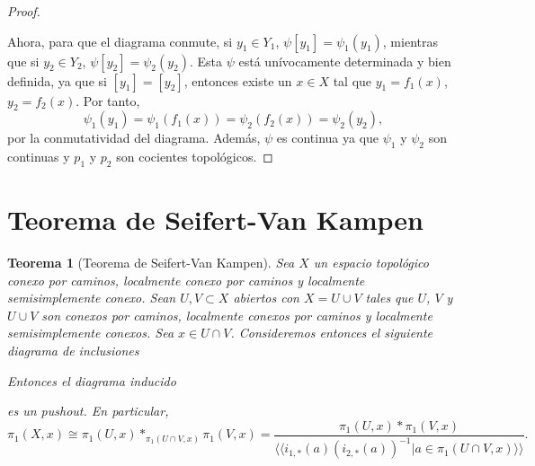 \documentclass[12pt,a4paper]{book}
\newtheorem{thm}{Teorema}[section]
\theoremstyle{definition} \newtheorem{defn}[thm]{Definición}
\theoremstyle{definition} \newtheorem{ejemplo}[thm]{Ejemplo}
\theoremstyle{definition} \newtheorem{ejercicio}[thm]{Ejercicio}
\theoremstyle{remark} \newtheorem*{obs}{Observación}
\def\gf{\pi_1}
\begin{document}
\begin{proof}
\begin{center}
\begin{tikzcd}
    \end{tikzcd}
  \end{center}
  Ahora, para que el diagrama conmute, si $y_1 \in Y_1$, $\psi[y_1]=\psi_1(y_1)$, mientras que si $y_2 \in Y_2$, $\psi[y_2]=\psi_2(y_2)$. Esta $\psi$ está unívocamente determinada y bien definida, ya que si $[y_1]=[y_2]$, entonces existe un $x\in X$ tal que $y_1=f_1(x)$, $y_2=f_2(x)$. Por tanto,
  \begin{equation*}
    \psi_1(y_1)=\psi_1(f_1(x))=\psi_2(f_2(x))=\psi_2(y_2),	
  \end{equation*}
  por la conmutatividad del diagrama.
  Además, $\psi$ es continua ya que $\psi_1$ y $\psi_2$ son continuas y $p_1$ y $p_2$ son cocientes topológicos.
\end{proof}

\section{Teorema de Seifert-Van Kampen}
\begin{thm}[Teorema de Seifert-Van Kampen]
 Sea $X$ un espacio topológico conexo por caminos, localmente conexo por caminos y localmente semisimplemente conexo. Sean $U,V\subset X$ abiertos con $X=U\cup V$ tales que $U$, $V$ y $U\cup V$ son conexos por caminos, localmente conexos por caminos y localmente semisimplemente conexos. Sea $x\in U\cap V$. Consideremos entonces el siguiente diagrama de inclusiones
 \begin{center}
 \end{center}
 Entonces el diagrama inducido
 \begin{center}
 \end{center}
 es un pushout. En particular, $$\gf(X,x)\cong \gf(U,x)*_{\gf(U\cap V,x)}\gf(V,x)=\frac{\gf(U,x)*\gf(V,x)}{\langle \langle i_{1,*}(a)(i_{2,*}(a))^{-1}|a\in \gf(U\cap V,x)\rangle \rangle}.$$
\end{thm}
\end{document}
